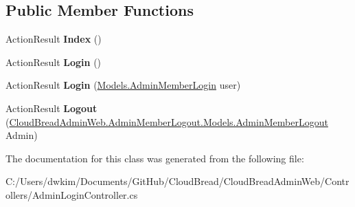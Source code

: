 \subsection*{Public Member Functions}
\begin{DoxyCompactItemize}
\item 
Action\+Result {\bfseries Index} ()\hypertarget{class_cloud_bread_admin_web_1_1_admin_member_login_1_1_models_1_1_controllers_1_1_admin_login_controller_a6a86ef816be4f0469f4a305f5dd6ecf2}{}\label{class_cloud_bread_admin_web_1_1_admin_member_login_1_1_models_1_1_controllers_1_1_admin_login_controller_a6a86ef816be4f0469f4a305f5dd6ecf2}

\item 
Action\+Result {\bfseries Login} ()\hypertarget{class_cloud_bread_admin_web_1_1_admin_member_login_1_1_models_1_1_controllers_1_1_admin_login_controller_a2bc2253d4535bb67490f8b5cc1ee84b7}{}\label{class_cloud_bread_admin_web_1_1_admin_member_login_1_1_models_1_1_controllers_1_1_admin_login_controller_a2bc2253d4535bb67490f8b5cc1ee84b7}

\item 
Action\+Result {\bfseries Login} (\hyperlink{class_cloud_bread_admin_web_1_1_admin_member_login_1_1_models_1_1_admin_member_login}{Models.\+Admin\+Member\+Login} user)\hypertarget{class_cloud_bread_admin_web_1_1_admin_member_login_1_1_models_1_1_controllers_1_1_admin_login_controller_a635757af63e9798fd3db50b278876d1e}{}\label{class_cloud_bread_admin_web_1_1_admin_member_login_1_1_models_1_1_controllers_1_1_admin_login_controller_a635757af63e9798fd3db50b278876d1e}

\item 
Action\+Result {\bfseries Logout} (\hyperlink{class_cloud_bread_admin_web_1_1_admin_member_logout_1_1_models_1_1_admin_member_logout}{Cloud\+Bread\+Admin\+Web.\+Admin\+Member\+Logout.\+Models.\+Admin\+Member\+Logout} Admin)\hypertarget{class_cloud_bread_admin_web_1_1_admin_member_login_1_1_models_1_1_controllers_1_1_admin_login_controller_a4a8d0c87d51f509f1185c13223d623f4}{}\label{class_cloud_bread_admin_web_1_1_admin_member_login_1_1_models_1_1_controllers_1_1_admin_login_controller_a4a8d0c87d51f509f1185c13223d623f4}

\end{DoxyCompactItemize}


The documentation for this class was generated from the following file\+:\begin{DoxyCompactItemize}
\item 
C\+:/\+Users/dwkim/\+Documents/\+Git\+Hub/\+Cloud\+Bread/\+Cloud\+Bread\+Admin\+Web/\+Controllers/Admin\+Login\+Controller.\+cs\end{DoxyCompactItemize}
